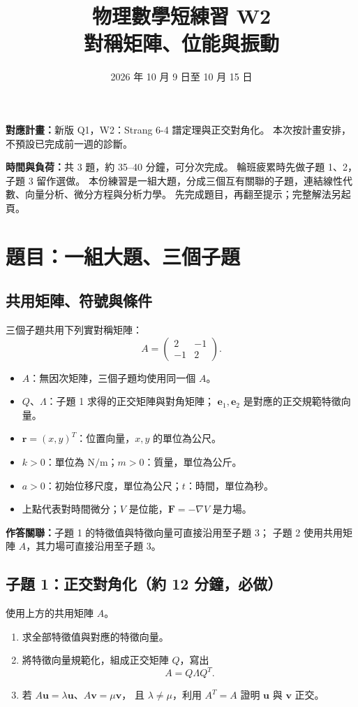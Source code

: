 \documentclass[12pt,a4paper]{article}
\title{物理數學短練習 W2\\對稱矩陣、位能與振動}
\author{}
\date{2026 年 10 月 9 日至 10 月 15 日}
\begin{document}
\maketitle
\vspace{-1.2em}
\textbf{對應計畫：}新版 Q1，W2：Strang 6-4 譜定理與正交對角化。
本次按計畫安排，不預設已完成前一週的診斷。

\textbf{時間與負荷：}共 3 題，約 35--40 分鐘，可分次完成。
輪班疲累時先做子題 1、2，子題 3 留作選做。
本份練習是一組大題，分成三個互有關聯的子題，連結線性代數、向量分析、微分方程與分析力學。
先完成題目，再翻至提示；完整解法另起頁。

\section{題目：一組大題、三個子題}
\subsection*{共用矩陣、符號與條件}
三個子題共用下列實對稱矩陣：
\[
    A=\begin{pmatrix}2&-1\\-1&2\end{pmatrix}.
\]
\begin{itemize}
    \item \(A\)：無因次矩陣，三個子題均使用同一個 \(A\)。
    \item \(Q\)、\(\Lambda\)：子題 1 求得的正交矩陣與對角矩陣；
          \(\mathbf e_1,\mathbf e_2\) 是對應的正交規範特徵向量。
    \item \(\mathbf r=(x,y)^T\)：位置向量，\(x,y\) 的單位為公尺。
    \item \(k>0\)：單位為 \(\mathrm{N/m}\)；\(m>0\)：質量，單位為公斤。
    \item \(a>0\)：初始位移尺度，單位為公尺；\(t\)：時間，單位為秒。
    \item 上點代表對時間微分；\(V\) 是位能，\(\mathbf F=-\nabla V\) 是力場。
\end{itemize}
\textbf{作答關聯：}子題 1 的特徵值與特徵向量可直接沿用至子題 3；
子題 2 使用共用矩陣 \(A\)，其力場可直接沿用至子題 3。

\clearpage
\subsection*{子題 1：正交對角化（約 12 分鐘，必做）}
使用上方的共用矩陣 \(A\)。
\begin{enumerate}
    \item 求全部特徵值與對應的特徵向量。
    \item 將特徵向量規範化，組成正交矩陣 \(Q\)，寫出
          \[
              A=Q\Lambda Q^T.
          \]
    \item 若 \(A\mathbf u=\lambda\mathbf u\)、\(A\mathbf v=\mu\mathbf v\)，
          且 \(\lambda\ne\mu\)，利用 \(A^T=A\) 證明 \(\mathbf u\) 與 \(\mathbf v\) 正交。
\end{enumerate}
\end{document}
